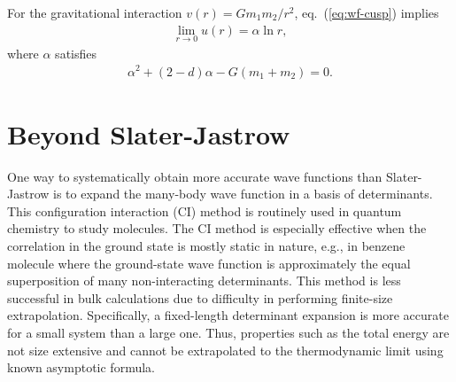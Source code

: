 For the gravitational interaction $v(r)=Gm_1m_2/r^2$, eq.~(\ref{eq:wf-cusp}) implies
\begin{align}
\lim\limits_{r\rightarrow 0} u(r) = \alpha\ln r,
\end{align}
where $\alpha$ satisfies
\begin{align}
\alpha^2 + (2-d)\alpha - G(m_1+m_2) = 0.
\end{align}







\section{Beyond Slater-Jastrow}
One way to systematically obtain more accurate wave functions than Slater-Jastrow is to expand the many-body wave function in a basis of determinants. This configuration interaction (CI) method is routinely used in quantum chemistry to study molecules. The CI method is especially effective when the correlation in the ground state is mostly static in nature, e.g., in benzene molecule where the ground-state wave function is approximately the equal superposition of many non-interacting determinants. This method is less successful in bulk calculations due to difficulty in performing finite-size extrapolation. Specifically, a fixed-length determinant expansion is more accurate for a small system than a large one. Thus, properties such as the total energy are not size extensive and cannot be extrapolated to the thermodynamic limit using known asymptotic formula.

